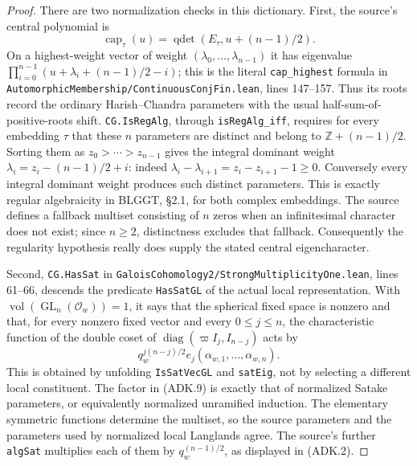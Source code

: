 \documentclass[11pt,a4paper]{article}
\numberwithin{equation}{section}
\theoremstyle{remark}\newtheorem{remark}[theorem]{Remark}
\begin{document}
\begin{proof}
There are two normalization checks in this dictionary.
First, the source's central polynomial is
\[
 \operatorname{cap}_{\tau}(u)
    =\operatorname{qdet}(E_{\tau},\allowbreak{} u+(n-1)/2).
\]
On a highest-weight vector of weight $(\lambda_0,\ldots,
\lambda_{n-1})$ it has eigenvalue
$\prod_{i=0}^{n-1}(u+\lambda_i+(n-1)/2-i)$;
this is the literal \texttt{cap\_\allowbreak highest} formula in
\texttt{Automorphic\allowbreak Membership/\allowbreak Continuous\allowbreak Conj\allowbreak Fin.\allowbreak lean},
lines 147--157.  Thus its roots record the ordinary
Harish--Chandra parameters with the usual half-sum-of-positive-roots
shift.  \texttt{CG.\allowbreak Is\allowbreak Reg\allowbreak Alg}, through
\texttt{is\allowbreak Reg\allowbreak Alg\_\allowbreak iff}, requires for every embedding $\tau$ that
these $n$ parameters are distinct and belong to
$\mathbb Z+(n-1)/2$.  Sorting them as
$z_0>\cdots>z_{n-1}$ gives the integral dominant weight
$\lambda_i=z_i-(n-1)/2+i$: indeed
$\lambda_i-\lambda_{i+1}=z_i-z_{i+1}-1\ge0$.
Conversely every integral dominant weight produces such distinct
parameters.  This is exactly regular algebraicity in BLGGT,
\S2.1, for both complex embeddings.  The source defines a fallback
multiset consisting of $n$ zeros when an infinitesimal character
does not exist; since $n\ge2$, distinctness excludes that fallback.
Consequently the regularity hypothesis really does supply the
stated central eigencharacter.

Second, \texttt{CG.\allowbreak Has\allowbreak Sat} in
\texttt{Galois\allowbreak Cohomology2/\allowbreak Strong\allowbreak Multiplicity\allowbreak One.\allowbreak lean},
lines 61--66, descends the predicate
\texttt{Has\allowbreak Sat\allowbreak GL} of the actual local representation.  With
$\operatorname{vol}(\operatorname{GL}_n(\mathcal O_w))=1$, it
says that the spherical fixed space is nonzero and that, for every
nonzero fixed vector and every $0\le j\le n$, the characteristic
function of the double coset of
$\operatorname{diag}(\varpi I_j,\allowbreak{} I_{n-j})$ acts by
\[
             q_w^{j(n-j)/2} e_j(\alpha_{w,1},\ldots,
                                    \alpha_{w,\allowbreak{} n}).
 \tag{ADK.9}
\]
This is obtained by unfolding \texttt{Is\allowbreak Sat\allowbreak Vec\allowbreak GL} and
\texttt{sat\allowbreak Eig}, not by selecting a different local constituent.
The factor in (ADK.9) is exactly that of normalized Satake
parameters, or equivalently normalized unramified induction.
The elementary symmetric functions determine the multiset, so the
source parameters and the parameters used by normalized local
Langlands agree.  The source's further \texttt{alg\allowbreak Sat} multiplies
each of them by $q_w^{(n-1)/2}$, as displayed in (ADK.2).


\end{proof}
\end{document}
